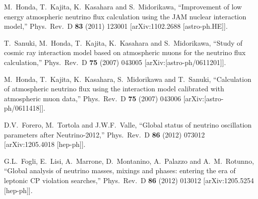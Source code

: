 \begin{thebibliography}{99}
M.~Honda, T.~Kajita, K.~Kasahara and S.~Midorikawa, ``Improvement of low energy atmospheric neutrino flux calculation using the JAM nuclear interaction model,'' Phys.\ Rev.\ D {\bf 83} (2011) 123001 [arXiv:1102.2688 [astro-ph.HE]].

T.~Sanuki, M.~Honda, T.~Kajita, K.~Kasahara and S.~Midorikawa, ``Study of cosmic ray interaction model based on atmospheric muons for the neutrino flux calculation,'' Phys.\ Rev.\ D {\bf 75} (2007) 043005 [arXiv:[astro-ph/0611201]].

M.~Honda, T.~Kajita, K.~Kasahara, S.~Midorikawa and T.~Sanuki, ``Calculation of atmospheric neutrino flux using the interaction model calibrated with atmospheric muon data,'' Phys.\ Rev.\ D {\bf 75} (2007) 043006 [arXiv:[astro-ph/0611418]].

D.\/V.~Forero, M.~Tortola and J.\/W.\/F.~Valle, ``Global status of neutrino oscillation parameters after Neutrino-2012,'' Phys.\ Rev.\ D {\bf 86} (2012) 073012 [arXiv:1205.4018 [hep-ph]].

G.\/L.~Fogli, E.~Lisi, A.~Marrone, D.~Montanino, A.~Palazzo and A.~M.~Rotunno, ``Global analysis of neutrino masses, mixings and phases: entering the era of leptonic CP violation searches,''  Phys.\ Rev.\ D {\bf 86} (2012) 013012 [arXiv:1205.5254 [hep-ph]].
\end{thebibliography}
